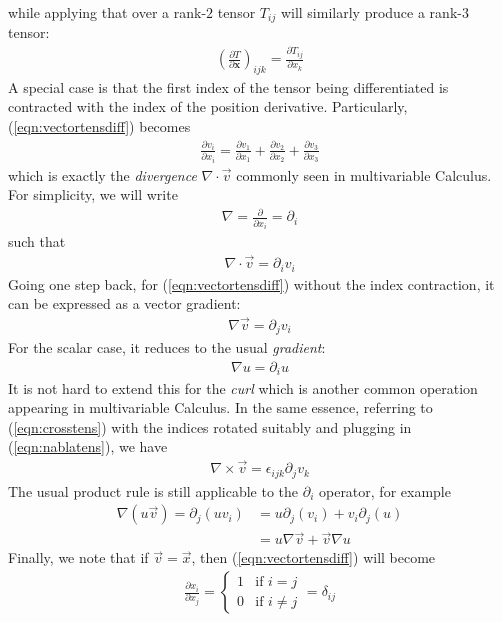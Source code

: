 while applying that over a rank-$2$ tensor $T_{ij}$ will similarly produce a rank-$3$ tensor:
\begin{align}
\left(\frac{\partial T}{\partial \textbf{x}}\right)_{ijk} = \frac{\partial T_{ij}}{\partial x_k}
\end{align}
A special case is that the first index of the tensor being differentiated is contracted with the index of the position derivative. Particularly, (\ref{eqn:vectortensdiff}) becomes
\begin{align}
\frac{\partial v_i}{\partial x_i} = \frac{\partial v_1}{\partial x_1} + \frac{\partial v_2}{\partial x_2} + \frac{\partial v_3}{\partial x_3}
\end{align}
which is exactly the \textit{divergence} $\nabla \cdot \vec{v}$ commonly seen in multivariable Calculus. For simplicity, we will write 
\begin{align}
\nabla = \frac{\partial}{\partial x_i} = \partial_i \label{eqn:nablatens}
\end{align}
such that
\begin{align}
\nabla \cdot \vec{v} = \partial_i v_i \label{eqn:divv}
\end{align}
Going one step back, for (\ref{eqn:vectortensdiff}) without the index contraction, it can be expressed as a vector gradient:
\begin{align}
\nabla \vec{v} = \partial_j v_i
\end{align}
For the scalar case, it reduces to the usual \textit{gradient}:
\begin{align}
\nabla u = \partial_i u
\end{align}
It is not hard to extend this for the \textit{curl} which is another common operation appearing in multivariable Calculus. In the same essence, referring to (\ref{eqn:crosstens}) with the indices rotated suitably and plugging in (\ref{eqn:nablatens}), we have
\begin{align}
\nabla \times \vec{v} = \epsilon_{ijk} \partial_j v_k \label{eqn:curltens}
\end{align}
The usual product rule is still applicable to the $\partial_i$ operator, for example
\begin{align*}
\nabla(u\vec{v}) = \partial_j(uv_i) &= u\partial_j(v_i) + v_i\partial_j(u) \\
&= u \nabla \vec{v} + \vec{v}\nabla u
\end{align*}
Finally, we note that if $\vec{v} = \vec{x}$, then (\ref{eqn:vectortensdiff}) will become
\begin{align}
\frac{\partial x_i}{\partial x_j} = \begin{cases}
1 & \text{if $i=j$} \\
0 & \text{if $i\neq j$}
\end{cases} = \delta_{ij}
\label{eqn:dxdxdelta}
\end{align}
